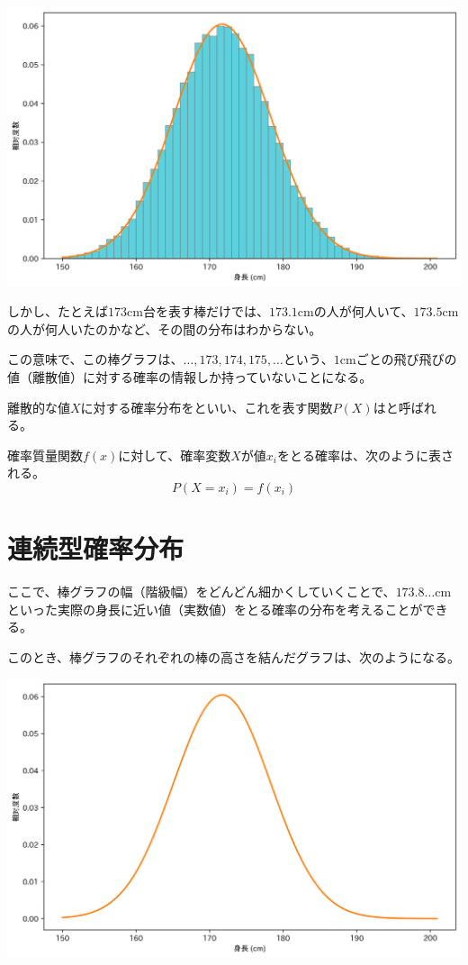 \documentclass[../../../topic_statistics]{subfiles}
\begin{document}
\br

\includegraphics[width=0.95\linewidth]{./python/sampling-height_discrete.png}

\br

しかし、たとえば$173$cm台を表す棒だけでは、$173.1$cmの人が何人いて、$173.5$cmの人が何人いたのかなど、その間の分布はわからない。

この意味で、この棒グラフは、$\ldots,173, 174, 175,\ldots$という、$1$cmごとの飛び飛びの値（離散値）に対する確率の情報しか持っていないことになる。

\br

離散的な値$X$に対する確率分布をといい、これを表す関数$P(X)$はと呼ばれる。

\br

確率質量関数$f(x)$に対して、確率変数$X$が値$x_i$をとる確率は、次のように表される。
\begin{equation*}
  P(X = x_i) = f(x_i)
\end{equation*}

\sectionline
\section{連続型確率分布}

ここで、棒グラフの幅（階級幅）をどんどん細かくしていくことで、$173.8\dots$cmといった実際の身長に近い値（実数値）をとる確率の分布を考えることができる。

\br

このとき、棒グラフのそれぞれの棒の高さを結んだグラフは、次のようになる。

\br

\includegraphics[width=0.95\linewidth]{./python/sampling-height_continuous.png}
\end{document}

